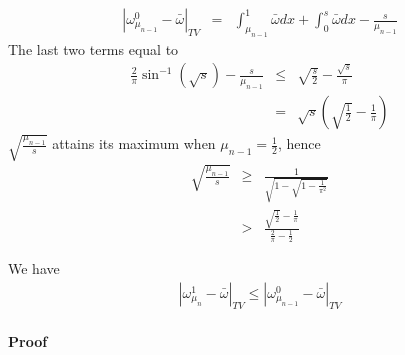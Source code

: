 \begin{eqnarray}
|\omega_{\mu_{n-1}}^0 -\bar{\omega}|_{TV}
   &=  & \int_{\mu_{n-1}}^1 \bar{\omega} dx +  \int_0^s \bar{\omega} dx - \frac{s}{\mu_{n-1}}
\end{eqnarray}
The last two terms equal to
\begin{eqnarray}
  \frac{2}{\pi} \sin^{-1}(\sqrt{s})- \frac{s}{\mu_{n-1}} 
  &\le & \sqrt{\frac{s}{2}} -\frac{\sqrt{s}}{\pi}\\
  & =  & \sqrt{s}\left(\sqrt{\frac{1}{2}}-\frac{1}{\pi} \right)
\end{eqnarray}
$\sqrt{\frac{\mu_{n-1}}{s}}$ attains its maximum when $\mu_{n-1}=\frac{1}{2}$, hence
\begin{eqnarray}
\sqrt{\frac{\mu_{n-1}}{s}} &\ge& \frac{1}{\sqrt{1-\sqrt{1-\frac{1}{\pi^2}}}} \\
                       & > & \frac{\sqrt{\frac{1}{2}}-\frac{1}{\pi} }{\frac{2}{\pi} - \frac{1}{2}}
\end{eqnarray}







\begin{lemma}
We have
  \begin{eqnarray} 
     |\omega_{\mu_n}^1-\bar{\omega}|_{TV} \le |\omega_{\mu_{n-1}}^0 -\bar{\omega}|_{TV}
  \end{eqnarray}
\end{lemma}

\paragraph{Proof}


